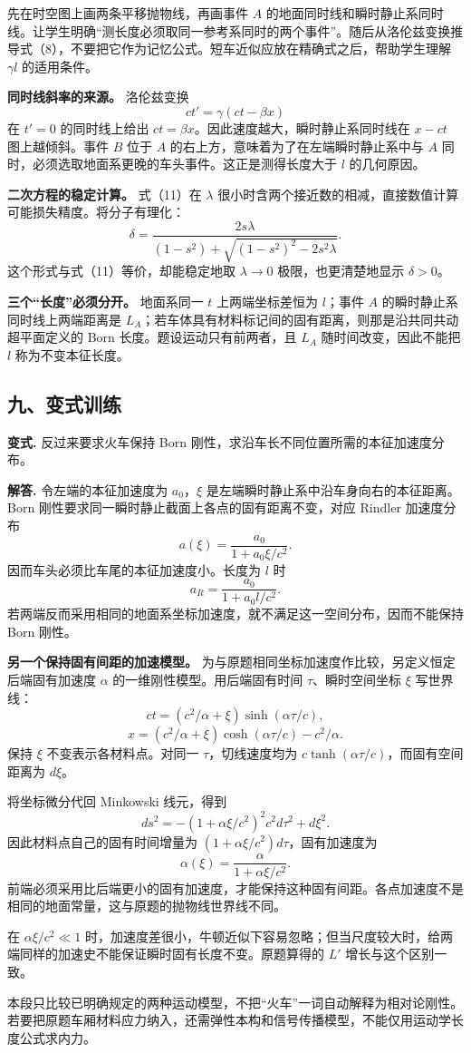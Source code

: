 \documentclass[12pt,a4paper,UTF8]{ctexart}
\begin{document}
先在时空图上画两条平移抛物线，再画事件 \(A\)
的地面同时线和瞬时静止系同时线。让学生明确``测长度必须取同一参考系同时的两个事件''。随后从洛伦兹变换推导式（8），不要把它作为记忆公式。短车近似应放在精确式之后，帮助学生理解
\(\gamma l\) 的适用条件。

\textbf{同时线斜率的来源。} 洛伦兹变换 \[
ct'=\gamma(ct-\beta x)
\] 在 \(t'=0\) 的同时线上给出
\(ct=\beta x\)。因此速度越大，瞬时静止系同时线在 \(x-ct\)
图上越倾斜。事件 \(B\) 位于 \(A\)
的右上方，意味着为了在左端瞬时静止系中与 \(A\)
同时，必须选取地面系更晚的车头事件。这正是测得长度大于 \(l\)
的几何原因。

\textbf{二次方程的稳定计算。} 式（11）在 \(\lambda\)
很小时含两个接近数的相减，直接数值计算可能损失精度。将分子有理化： \[
\delta=
\frac{2s\lambda}
{(1-s^2)+\sqrt{(1-s^2)^2-2s^2\lambda}}.
\] 这个形式与式（11）等价，却能稳定地取 \(\lambda\to0\)
极限，也更清楚地显示 \(\delta>0\)。

\textbf{三个``长度''必须分开。} 地面系同一 \(t\) 上两端坐标差恒为
\(l\)；事件 \(A\) 的瞬时静止系同时线上两端距离是
\(L_A\)；若车体具有材料标记间的固有距离，则那是沿共同共动超平面定义的
Born 长度。题设运动只有前两者，且 \(L_A\) 随时间改变，因此不能把 \(l\)
称为不变本征长度。

\subsection{九、变式训练}\label{ux4e5dux53d8ux5f0fux8badux7ec3-7}

\textbf{变式.} 反过来要求火车保持 Born
刚性，求沿车长不同位置所需的本征加速度分布。

\textbf{解答.} 令左端的本征加速度为 \(a_0\)，\(\xi\)
是左端瞬时静止系中沿车身向右的本征距离。Born
刚性要求同一瞬时静止截面上各点的固有距离不变，对应 Rindler 加速度分布 \[
\boxed{a(\xi)=\frac{a_0}{1+a_0\xi/c^2}}.
\] 因而车头必须比车尾的本征加速度小。长度为 \(l\) 时 \[
a_R=\frac{a_0}{1+a_0l/c^2}.
\]
若两端反而采用相同的地面系坐标加速度，就不满足这一空间分布，因而不能保持
Born 刚性。

\textbf{另一个保持固有间距的加速模型。}
为与原题相同坐标加速度作比较，另定义恒定后端固有加速度 \(\alpha\)
的一维刚性模型。用后端固有时间 \(\tau\)、瞬时空间坐标 \(\xi\) 写世界线：
\[
ct=(c^2/\alpha+\xi)\sinh(\alpha\tau/c),
\] \[
x=(c^2/\alpha+\xi)\cosh(\alpha\tau/c)-c^2/\alpha.
\] 保持 \(\xi\) 不变表示各材料点。对同一 \(\tau\)，切线速度均为
\(c\tanh(\alpha\tau/c)\)，而固有空间距离为 \(d\xi\)。

将坐标微分代回 Minkowski 线元，得到 \[
ds^2=-(1+\alpha\xi/c^2)^2c^2d\tau^2+d\xi^2.
\] 因此材料点自己的固有时间增量为
\((1+\alpha\xi/c^2)d\tau\)，固有加速度为 \[
\alpha(\xi)=\frac{\alpha}{1+\alpha\xi/c^2}.
\]
前端必须采用比后端更小的固有加速度，才能保持这种固有间距。各点加速度不是相同的地面常量，这与原题的抛物线世界线不同。

在 \(\alpha\xi/c^2\ll1\)
时，加速度差很小，牛顿近似下容易忽略；但当尺度较大时，给两端同样的加速史不能保证瞬时固有长度不变。原题算得的
\(L'\) 增长与这个区别一致。

本段只比较已明确规定的两种运动模型，不把``火车''一词自动解释为相对论刚性。若要把原题车厢材料应力纳入，还需弹性本构和信号传播模型，不能仅用运动学长度公式求内力。
\end{document}
